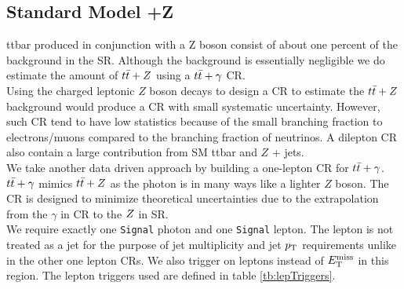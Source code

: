 \subsection{Standard Model \ttbar+Z}
\label{sec:Bkg:ttV}

\indent ttbar produced in conjunction with a Z boson consist of about one percent of the background in the SR.  Although the background is essentially negligible we do estimate the amount of $t\bar{t}+Z$ using a $t\bar{t}+\gamma$ CR. \\

\indent Using the charged leptonic $Z$ boson decays to design a CR to estimate the $t\bar{t}+Z$ background would produce a CR with small systematic uncertainty. However, such CR tend to have low statistics because of the small branching fraction to electrons/muons compared to the branching fraction of neutrinos.  A dilepton CR also contain a large contribution from SM ttbar and $Z$ + jets. \\

\indent We take another data driven approach by building a one-lepton CR for $t\bar{t}+\gamma$.  $t\bar{t}+\gamma$ mimics $t\bar{t}+Z$ as the photon is in many ways like a lighter $Z$ boson.  The CR is designed to minimize theoretical uncertainties due to the extrapolation from the $\gamma$ in CR to the $Z$ in SR. \\

\indent We require exactly one {\tt Signal} photon and one {\tt Signal} lepton.  The lepton is not treated as a jet for the purpose of jet multiplicity and jet $p_{\mathrm{T}}$ requirements unlike in the other one lepton CRs.  We also trigger on leptons instead of $E_{\mathrm{T}}^{\mathrm{miss}}$ in this region. The lepton triggers used are defined in table \ref{tb:lepTriggers}.  \\

